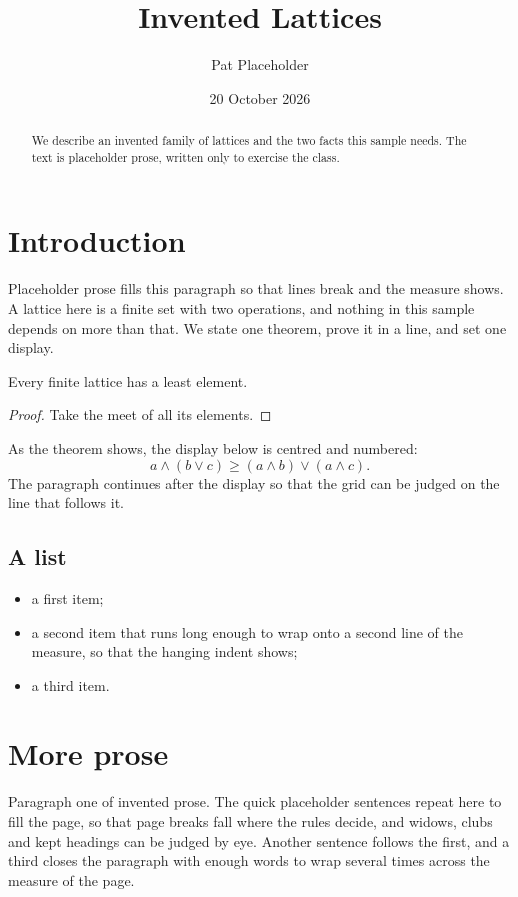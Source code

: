 \documentclass{ltflow}
\title{Invented Lattices}
\author{Pat Placeholder}
\date{20 October 2026}
\begin{document}
\maketitle
\begin{abstract}
We describe an invented family of lattices and the two facts this sample needs.
The text is placeholder prose, written only to exercise the class.
\end{abstract}
\section{Introduction}
Placeholder prose fills this paragraph so that lines break and the measure shows. A lattice
here is a finite set with two operations, and nothing in this sample depends on more than that.
We state one theorem, prove it in a line, and set one display.
\begin{theorem}
Every finite lattice has a least element.
\end{theorem}
\begin{proof}
Take the meet of all its elements.
\end{proof}
As the theorem shows, the display below is centred and numbered:
\begin{equation}
  a \wedge (b \vee c) \ge (a \wedge b) \vee (a \wedge c).
\end{equation}
The paragraph continues after the display so that the grid can be judged on the line that
follows it.
\subsection{A list}
\begin{itemize}
\item a first item;
\item a second item that runs long enough to wrap onto a second line of the measure, so that
  the hanging indent shows;
\item a third item.
\end{itemize}
\section{More prose}
Paragraph one of invented prose. The quick placeholder sentences repeat here to fill the page,
so that page breaks fall where the rules decide, and widows, clubs and kept headings can be
judged by eye. Another sentence follows the first, and a third closes the paragraph with enough
words to wrap several times across the measure of the page.
\end{document}
